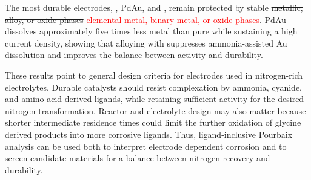 \documentclass[twoside,twocolumn,9pt]{article}
\begin{document}
The most durable electrodes, , PdAu, and , remain protected by stable \sout{metallic, alloy, or oxide phases} \textcolor{red}{elemental-metal, binary-metal, or oxide phases}. PdAu dissolves approximately five times less metal than pure  while sustaining a high current density, showing that alloying with  suppresses ammonia-assisted Au dissolution and improves the balance between activity and durability.

These results point to general design criteria for electrodes used in nitrogen-rich electrolytes. Durable catalysts should resist complexation by ammonia, cyanide, and amino acid derived ligands, while retaining sufficient activity for the desired nitrogen transformation. Reactor and electrolyte design may also matter because shorter intermediate residence times could limit the further oxidation of glycine derived products into more corrosive ligands. Thus, ligand-inclusive Pourbaix analysis can be used both to interpret electrode dependent corrosion and to screen candidate materials for a balance between nitrogen recovery and durability.

\end{document}
